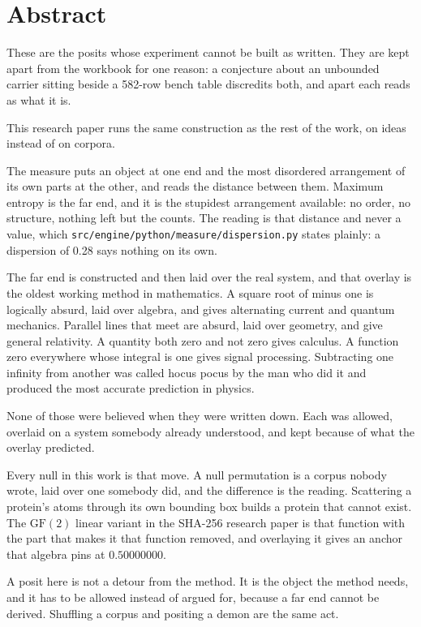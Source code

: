 \chapter*{Abstract}

These are the posits whose experiment cannot be built as written. They are kept apart from the
workbook for one reason: a conjecture about an unbounded carrier sitting beside a 582-row bench table
discredits both, and apart each reads as what it is.

This research paper runs the same construction as the rest of the work, on ideas instead of on corpora.

The measure puts an object at one end and the most disordered arrangement of its own parts at the
other, and reads the distance between them. Maximum entropy is the far end, and it is the stupidest
arrangement available: no order, no structure, nothing left but the counts. The reading is that
distance and never a value, which \texttt{src/\allowbreak{}engine/\allowbreak{}python/\allowbreak{}measure/\allowbreak{}dispersion.\allowbreak{}py} states plainly: a
dispersion of 0.28 says nothing on its own.

The far end is constructed and then laid over the real system, and that overlay is the oldest working
method in mathematics. A square root of minus one is logically absurd, laid over algebra, and gives
alternating current and quantum mechanics. Parallel lines that meet are absurd, laid over geometry,
and give general relativity. A quantity both zero and not zero gives calculus. A function zero
everywhere whose integral is one gives signal processing. Subtracting one infinity from another was
called hocus pocus by the man who did it and produced the most accurate prediction in physics.

None of those were believed when they were written down. Each was allowed, overlaid on a system
somebody already understood, and kept because of what the overlay predicted.

Every null in this work is that move. A null permutation is a corpus nobody wrote, laid over one
somebody did, and the difference is the reading. Scattering a protein's atoms through its own
bounding box builds a protein that cannot exist. The $\mathrm{GF}(2)$ linear variant in the SHA-256
research paper is that function with the part that makes it that function removed, and overlaying it gives an
anchor that algebra pins at $0.50000000$.

A posit here is not a detour from the method. It is the object the method needs, and it has to be
allowed instead of argued for, because a far end cannot be derived. Shuffling a corpus and positing
a demon are the same act.

